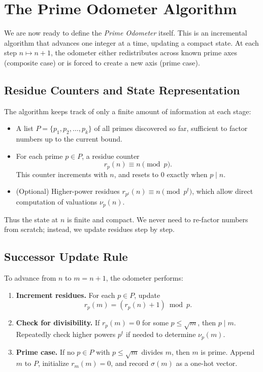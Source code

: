 \documentclass[11pt]{article}
\theoremstyle{definition}
\begin{document}
\section{The Prime Odometer Algorithm}

We are now ready to define the \emph{Prime Odometer} itself. 
This is an incremental algorithm that advances one integer at a time, 
updating a compact state. 
At each step $n \mapsto n+1$, the odometer either redistributes across 
known prime axes (composite case) or is forced to create a new axis (prime case). 

\subsection{Residue Counters and State Representation}

The algorithm keeps track of only a finite amount of information at each stage:

\begin{itemize}
  \item A list $P = \{p_1, p_2, \dots, p_k\}$ of all primes discovered so far, 
        sufficient to factor numbers up to the current bound.
  \item For each prime $p \in P$, a residue counter
        \[
        r_p(n) \equiv n \pmod{p}.
        \]
        This counter increments with $n$, and resets to $0$ exactly when $p \mid n$.
  \item (Optional) Higher-power residues $r_{p^t}(n) \equiv n \pmod{p^t}$, 
        which allow direct computation of valuations $\nu_p(n)$.
\end{itemize}

Thus the state at $n$ is finite and compact.  
We never need to re-factor numbers from scratch; 
instead, we update residues step by step.

\subsection{Successor Update Rule}

To advance from $n$ to $m = n+1$, the odometer performs:

\begin{enumerate}
  \item \textbf{Increment residues.}  
        For each $p \in P$, update
        \[
        r_p(m) = (r_p(n) + 1) \bmod p.
        \]
  \item \textbf{Check for divisibility.}  
        If $r_p(m) = 0$ for some $p \leq \sqrt{m}$, 
        then $p \mid m$.  
        Repeatedly check higher powers $p^t$ if needed to determine $\nu_p(m)$.
  \item \textbf{Prime case.}  
        If no $p \in P$ with $p \leq \sqrt{m}$ divides $m$, 
        then $m$ is prime.  
        Append $m$ to $P$, initialize $r_m(m) = 0$, 
        and record $\sigma(m)$ as a one-hot vector.
\end{enumerate}
\end{document}
